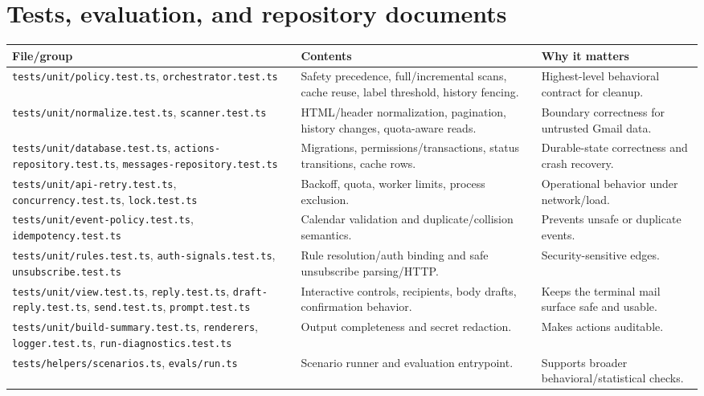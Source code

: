 \documentclass[12pt,oneside]{book}
\newcommand{\file}[1]{\nolinkurl{#1}}
\begin{document}
\section{Tests, evaluation, and repository documents}

\begingroup\scriptsize
\begin{longtable}{P{4.0cm}P{5.6cm}P{6.8cm}}
\toprule
\textbf{File/group} & \textbf{Contents} & \textbf{Why it matters} \\
\midrule
\endhead
\file{tests/unit/policy.test.ts}, \file{orchestrator.test.ts} & Safety precedence, full/incremental scans, cache reuse, label threshold, history fencing. & Highest-level behavioral contract for cleanup. \\
\file{tests/unit/normalize.test.ts}, \file{scanner.test.ts} & HTML/header normalization, pagination, history changes, quota-aware reads. & Boundary correctness for untrusted Gmail data. \\
\file{tests/unit/database.test.ts}, \file{actions-repository.test.ts}, \file{messages-repository.test.ts} & Migrations, permissions/transactions, status transitions, cache rows. & Durable-state correctness and crash recovery. \\
\file{tests/unit/api-retry.test.ts}, \file{concurrency.test.ts}, \file{lock.test.ts} & Backoff, quota, worker limits, process exclusion. & Operational behavior under network/load. \\
\file{tests/unit/event-policy.test.ts}, \file{idempotency.test.ts} & Calendar validation and duplicate/collision semantics. & Prevents unsafe or duplicate events. \\
\file{tests/unit/rules.test.ts}, \file{auth-signals.test.ts}, \file{unsubscribe.test.ts} & Rule resolution/auth binding and safe unsubscribe parsing/HTTP. & Security-sensitive edges. \\
\file{tests/unit/view.test.ts}, \file{reply.test.ts}, \file{draft-reply.test.ts}, \file{send.test.ts}, \file{prompt.test.ts} & Interactive controls, recipients, body drafts, confirmation behavior. & Keeps the terminal mail surface safe and usable. \\
\file{tests/unit/build-summary.test.ts}, \file{renderers}, \file{logger.test.ts}, \file{run-diagnostics.test.ts} & Output completeness and secret redaction. & Makes actions auditable. \\
\file{tests/helpers/scenarios.ts}, \file{evals/run.ts} & Scenario runner and evaluation entrypoint. & Supports broader behavioral/statistical checks. \\

\end{longtable}
\end{document}
